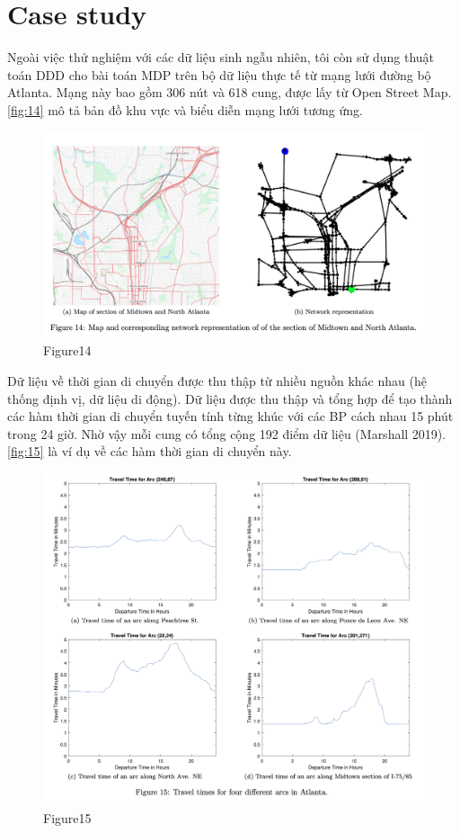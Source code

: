 \documentclass[../main.tex]{subfiles}
\begin{document}
\chapter{Case study}\label{case-study}

Ngoài việc thử nghiệm với các dữ liệu sinh ngẫu nhiên, tôi còn sử dụng
thuật toán DDD cho bài toán MDP trên bộ dữ liệu thực tế từ mạng lưới
đường bộ Atlanta. Mạng này bao gồm 306 nút và 618 cung, được lấy từ Open
Street Map. \autoref{fig:14} mô tả bản đồ khu vực và biểu diễn mạng lưới tương
ứng.

\begin{figure}
\centering
\includegraphics{images/Figure14.png}
\caption{Figure14}
\label{fig:14}
\end{figure}

Dữ liệu về thời gian di chuyển được thu thập từ nhiều nguồn khác nhau
(hệ thống định vị, dữ liệu di động). Dữ liệu được thu thập và tổng hợp
để tạo thành các hàm thời gian di chuyển tuyến tính từng khúc với các BP
cách nhau 15 phút trong 24 giờ. Nhờ vậy mỗi cung có tổng cộng 192 điểm
dữ liệu (Marshall 2019). \autoref{fig:15} là ví dụ về các hàm thời gian di chuyển
này.

\begin{figure}
\centering
\includegraphics{images/Figure15.png}
\caption{Figure15}
\label{fig:15}
\end{figure}
\end{document}
